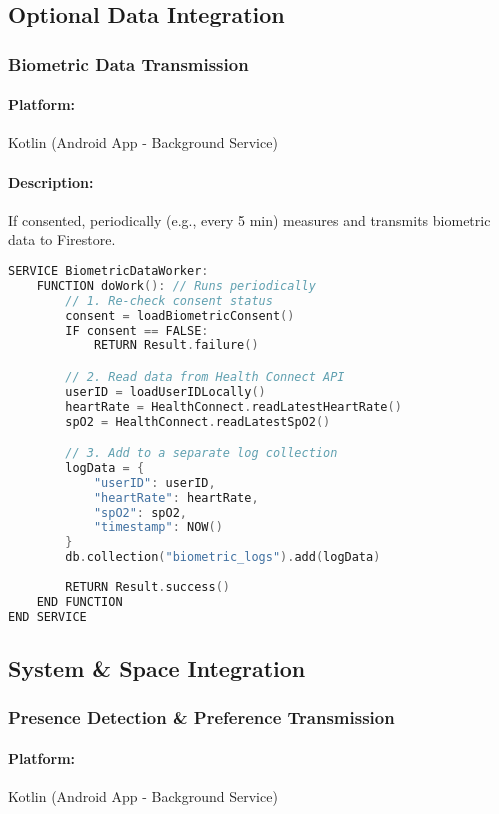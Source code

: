 \documentclass[conference]{IEEEtran}
\begin{document}
\subsection{Optional Data Integration}

\subsubsection{Biometric Data Transmission}
\paragraph{Platform:} Kotlin (Android App - Background Service)
\paragraph{Description:} If consented, periodically (e.g., every 5 min) measures and transmits biometric data to Firestore.

\begin{lstlisting}[language=Kotlin]
SERVICE BiometricDataWorker:
    FUNCTION doWork(): // Runs periodically
        // 1. Re-check consent status
        consent = loadBiometricConsent()
        IF consent == FALSE:
            RETURN Result.failure()

        // 2. Read data from Health Connect API
        userID = loadUserIDLocally()
        heartRate = HealthConnect.readLatestHeartRate()
        spO2 = HealthConnect.readLatestSpO2()

        // 3. Add to a separate log collection
        logData = {
            "userID": userID,
            "heartRate": heartRate,
            "spO2": spO2,
            "timestamp": NOW()
        }
        db.collection("biometric_logs").add(logData)
        
        RETURN Result.success()
    END FUNCTION
END SERVICE
\end{lstlisting}


\subsection{System \& Space Integration}

\subsubsection{Presence Detection \& Preference Transmission}
\paragraph{Platform:} Kotlin (Android App - Background Service)
\end{document}
